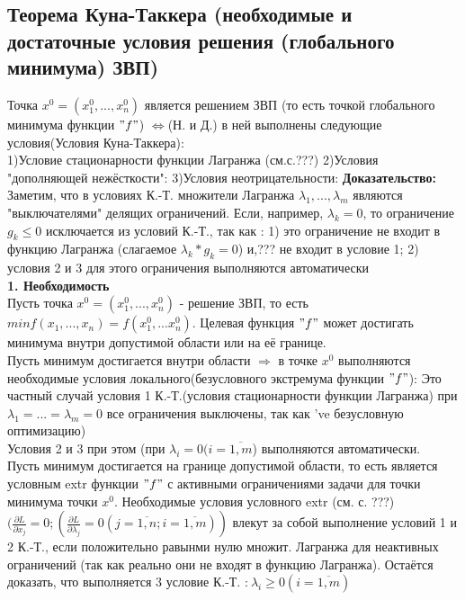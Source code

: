 \subsection*{Теорема Куна-Таккера (необходимые и достаточные условия решения (глобального минимума) ЗВП)} 
Точка $x^0=(x_1^0,...,x_n^0)$ является решением ЗВП (то есть точкой глобального минимума функции $"f"$) $\Leftrightarrow$(Н. и Д.) в ней выполнены следующие условия(Условия Куна-Таккера):\\
1)Условие стационарности функции Лагранжа (см.с.???)
2)Условия "дополняющей нежёсткости":
3)Условия неотрицательности:
\textbf{Доказательство:}\\
Заметим, что в условиях К.-Т. множители Лагранжа $\lambda_1,..., \lambda_m$ являются "выключателями" делящих ограничений. Если, например, $\lambda_k=0$, то ограничение $g_k \leq 0$ исключается из условий К.-Т., так как : 1) это ограничение не входит в функцию Лагранжа (слагаемое $\lambda_k*g_k = 0$) и,??? не входит в условие 1; 2) условия 2 и 3 для этого ограничения выполняются автоматически\\
\textbf{1. Необходимость}\\
Пусть точка $x^0=(x_1^0,...,x_n^0)$ - решение ЗВП, то есть $minf(x_1,...,x_n)=f(x_1^0,...x_n^0)$. Целевая функция $"f"$ может достигать минимума внутри допустимой области или на её границе.\\
Пусть минимум достигается внутри области $\Rightarrow$ в точке $x^0$ выполняются необходимые условия локального(безусловного экстремума функции $"f"$):
Это частный случай условия 1 К.-Т.(условия стационарности функции Лагранжа) при $\lambda_1=...=\lambda_m = 0$ все ограничения выключены, так как 've безусловную оптимизацию)\\
Условия 2 и 3 при этом (при $\lambda_i = 0 (i=\overline{1,m}$) выполняются автоматически.\\
Пусть минимум достигается на границе допустимой области, то есть является условным extr функции $"f"$ с активными ограничениями задачи для точки минимума точки $x^0$. Необходимые условия условного extr (см. с. ???) $(\frac{\partial L}{\partial x_j}=0;(\frac{\partial L}{\partial \lambda_j}=0 (j=\overline{1,n}; i=\overline{1,m}))$ влекут за собой выполнение условий 1 и 2 К.-Т., если положительно равынми нулю множит. Лагранжа для неактивных ограничений (так как реально они не входят в функцию Лагранжа). Остаётся доказать, что выполняется 3 условие К.-Т. :$\ \lambda_i \geq 0 (i=\overline{1,m})$ \\
